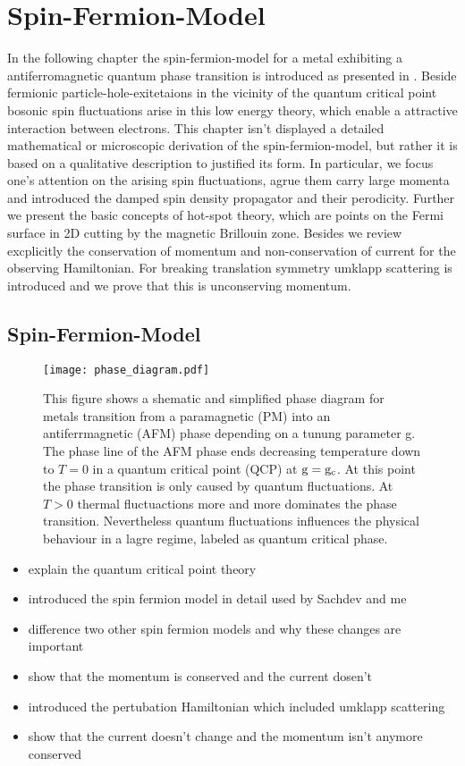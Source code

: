 %
%
%
\chapter{Spin-Fermion-Model}
\label{ch: spin fermion model}
%
%
%
In the following chapter the spin-fermion-model for a metal exhibiting a antiferromagnetic quantum phase transition is introduced as presented in \cite{Abanov&Chubukov&Schmalian}.
Beside fermionic particle-hole-exitetaions in the vicinity of the quantum critical point bosonic spin fluctuations arise in this low energy theory, which enable a attractive interaction between electrons.
This chapter isn't displayed a detailed mathematical or microscopic derivation of the spin-fermion-model, but rather it is based on a qualitative description to justified its form.
In particular, we focus one's attention on the arising spin fluctuations, agrue them carry large momenta and introduced the damped spin density propagator and their perodicity.
Further we present the basic concepts of hot-spot theory, which are points on the Fermi surface in 2D cutting by the magnetic Brillouin zone.
Besides we review excplicitly the conservation of momentum and non-conservation of current for the observing Hamiltonian.
For breaking translation symmetry umklapp scattering is introduced and we prove that this is unconserving momentum.
%
%
\section{Spin-Fermion-Model}
\label{sec:spin-fermion-model}
%
%
%
\begin{figure}[t]
	\centering
	\texttt{[image: phase\_diagram.pdf]}
	\caption{
This figure shows a shematic and simplified phase diagram for metals transition from a paramagnetic (PM) into an antiferrmagnetic (AFM) phase depending on a tunung parameter g.
The phase line of the AFM phase ends decreasing temperature down to $T = 0$ in a quantum critical point (QCP) at $\mathrm{g} = \mathrm{g}_{\mathrm{c}}$.
At this point the phase transition is only caused by quantum fluctuations.
At $T > 0$ thermal fluctuactions more and more dominates the phase transition.
Nevertheless quantum fluctuations influences the physical behaviour in a lagre regime, labeled as quantum critical phase.
	}
	\label{fig:phase diagram}
\end{figure}



\begin{itemize}
	\item explain the quantum critical point theory
	\item introduced the spin fermion model in detail used by Sachdev and me
	\item difference two other spin fermion models and why these changes are important
	\item show that the momentum is conserved and the current dosen't
	\item introduced the pertubation Hamiltonian which included umklapp scattering
	\item show that the current doesn't change and the momentum isn't anymore conserved
\end{itemize}